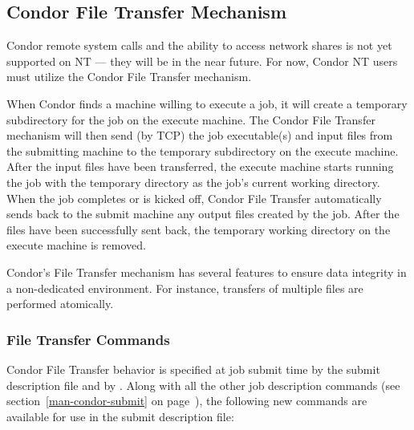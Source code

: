 \subsection{\label{sec:File-Transfer}Condor File Transfer Mechanism}

Condor remote system calls and the ability to access network shares is not
yet supported on NT --- they will be in the near future.  For now, Condor NT 
users must utilize the Condor File Transfer mechanism.  

When Condor finds a machine willing to execute a job, it will create a
temporary subdirectory for the job on the execute machine.
The Condor File Transfer mechanism will then send (by TCP) the job
executable(s) and input files from the submitting machine to the
temporary subdirectory on the execute machine.
After the input files have been transferred, the execute machine starts
running the job with the temporary directory as the job's current working
directory.
When the job completes or is kicked off, Condor File Transfer
automatically sends back to the submit machine any output files created by
the job.
After the files have been successfully sent back, the temporary
working directory on the execute machine is removed.

Condor's File Transfer mechanism has several features to ensure data
integrity in a non-dedicated environment.  For instance, transfers of
multiple files are performed atomically.

\subsubsection{File Transfer Commands}
Condor File Transfer behavior is specified at job submit time by the
submit description file and by .
Along with all the other job
description commands (see section~\ref{man-condor-submit} on
page~\pageref{man-condor-submit}), the following new commands 
are available for use in the submit description file:

